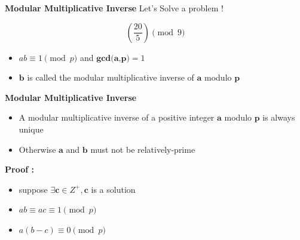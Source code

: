 \documentclass{beamer}
\begin{document}
\begin{frame}{\textbf{Modular Multiplicative Inverse}} 
    Let's Solve a problem !
    \begin{center}
    \begin{block}{}
        $$(\frac{20}{5}) \pmod 9$$
    \end{block}
    \end{center}
    \newline
    \newline
    \begin{center}
        \begin{itemize}
            \item<3-> $ab \equiv 1 \pmod p$ and $\textbf{gcd(a,p)} = 1$
            \item<4-> $\textbf{b}$ is called the modular multiplicative inverse of $\textbf{a}$ modulo $\textbf{p}$
        \end{itemize}
    \end{center}
\end{frame}

\begin{frame}{\textbf{Modular Multiplicative Inverse}}
    \begin{center}
        \begin{itemize}
            \item <1->A modular multiplicative inverse of a positive integer $\textbf{a}$ modulo $\textbf{p}$ is always unique
            \item <2->Otherwise $\textbf{a}$ and $\textbf{b}$ must not be   relatively-prime 
        \end{itemize}
    \end{center}
     {\textbf{Proof :}}
    \begin{center}
        \begin{itemize}
            \item <3->suppose $\exists \textbf{c} \in Z^{+} , \textbf{c}$ is a solution 
            \item <4->$ab \equiv ac \equiv 1 \pmod p$
            \item <5->$a(b-c)\equiv 0 \pmod p$
        \end{itemize}
    \end{center}
\end{frame}
\end{document}
